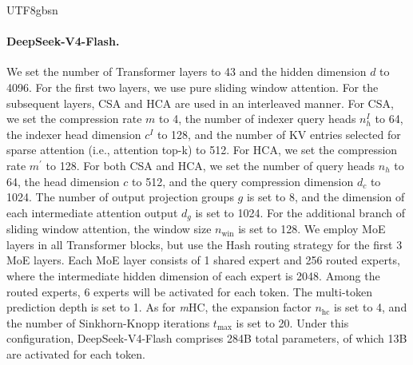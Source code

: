 \documentclass[11pt, a4paper, logo, copyright, nonumbering]{deepseek}
\newcommand{\dsvivf}{DeepSeek-V4-Flash}
\newcommand{\dsvivftp}{284B}
\newcommand{\dsvivfap}{13B}
\newcommand{\mhc}{\textit{m}HC}
\newcommand{\hca}{HCA}
\newcommand{\csa}{CSA}
\begin{document}
\begin{CJK*}{UTF8}{gbsn}
\paragraph{\dsvivf{}.}
We set the number of Transformer layers to 43 and the hidden dimension $d$ to 4096. 
For the first two layers, we use pure sliding window attention. 
For the subsequent layers, \csa{} and \hca{} are used in an interleaved manner.
For \csa{}, we set the compression rate $m$ to 4, the number of indexer query heads $n_h^I$ to 64, the indexer head dimension $c^I$ to 128, and the number of KV entries selected for sparse attention (i.e., attention top-k) to 512.  
For \hca{}, we set the compression rate $m^{\prime}$ to 128. 
For both \csa{} and \hca{}, we set the number of query heads $n_h$ to 64, the head dimension $c$ to 512, and the query compression dimension $d_c$ to 1024. 
The number of output projection groups $g$ is set to 8, and the dimension of each intermediate attention output $d_g$ is set to 1024.
For the additional branch of sliding window attention, the window size $n_{\text{win}}$ is set to 128. 
We employ MoE layers in all Transformer blocks, but use the Hash routing strategy for the first 3 MoE layers. 
Each MoE layer consists of 1 shared expert and 256 routed experts, where the intermediate hidden dimension of each expert is 2048. 
Among the routed experts, 6 experts will be activated for each token. 
The multi-token prediction depth is set to 1. 
As for \mhc{}, the expansion factor $n_{\text{hc}}$ is set to 4, and the number of Sinkhorn-Knopp iterations $t_{\text{max}}$ is set to 20. 
Under this configuration, \dsvivf{} comprises \dsvivftp{} total parameters, of which \dsvivfap{} are activated for each token. 


\end{CJK*}
\end{document}
